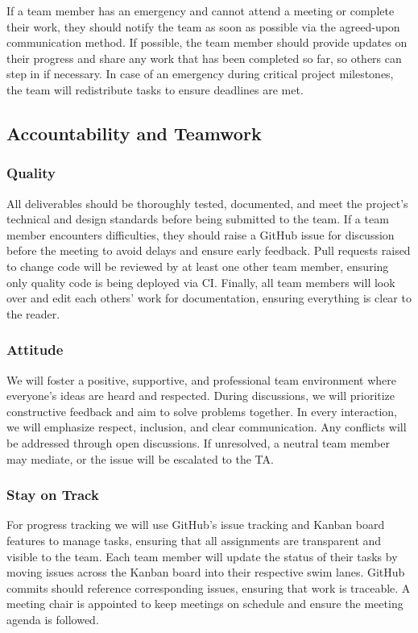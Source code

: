 \documentclass{article}
\begin{document}
If a team member has an emergency and cannot attend a meeting or complete their work, they should notify the team as soon as possible via the agreed-upon communication method. If possible, 
the team member should provide updates on their progress and share any work that has been completed so far, so others can step in if necessary. In case of an emergency during critical project milestones, 
the team will redistribute tasks to ensure deadlines are met.

\subsection*{Accountability and Teamwork}

\subsubsection*{Quality} 

All deliverables should be thoroughly tested, documented, and meet the project’s technical and design standards before being submitted to the team. If a team member encounters difficulties, 
they should raise a GitHub issue for discussion before the meeting to avoid delays and ensure early feedback. Pull requests raised to change code will be reviewed by at least one other team member, 
ensuring only quality code is being deployed via CI. Finally, all team members will look over and edit each others’ work for documentation, ensuring everything is clear to the reader.

\subsubsection*{Attitude}

We will foster a positive, supportive, and professional team environment where everyone’s ideas are heard and respected. During discussions, we will prioritize constructive feedback and aim to 
solve problems together. In every interaction, we will emphasize respect, inclusion, and clear communication. Any conflicts will be addressed through open discussions. If unresolved, a neutral 
team member may mediate, or the issue will be escalated to the TA.

\subsubsection*{Stay on Track}

For progress tracking we will use GitHub’s issue tracking and Kanban board features to manage tasks, ensuring that all assignments are transparent and visible to the team. Each team member 
will update the status of their tasks by moving issues across the Kanban board into their respective swim lanes. GitHub commits should reference corresponding issues, ensuring that work is traceable. 
A meeting chair is appointed to keep meetings on schedule and ensure the meeting agenda is followed.
\end{document}
